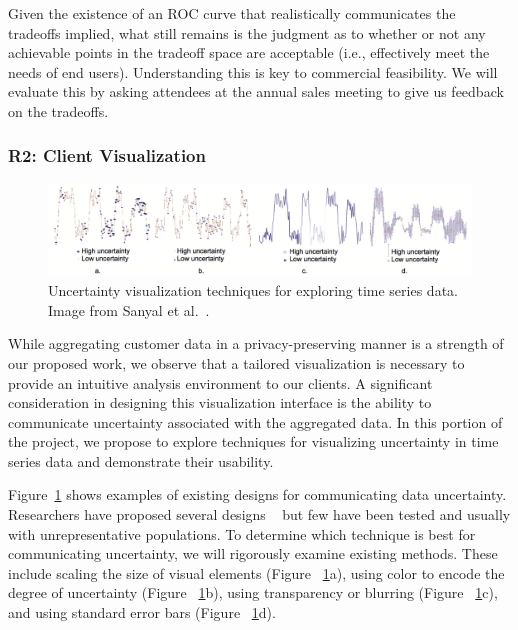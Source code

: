 Given the existence of an ROC curve that realistically communicates the
tradeoffs implied, what still remains is the judgment as to whether or
not any achievable points in the tradeoff space are acceptable (i.e.,
effectively meet the needs of end users).  Understanding
this is key to commercial
feasibility. We will evaluate this by
asking attendees at the annual sales meeting to give us feedback on 
the tradeoffs.

\subsubsection{R2: Client Visualization}

\begin{figure}[t]
	\centering
	\includegraphics[width=1.0\columnwidth]{uncertainty}
	\caption{Uncertainty visualization techniques for exploring time series data. Image from Sanyal et al.~\cite{sanyal2009user}.}
	\label{fig:uncertainty}
\end{figure}

While aggregating customer data in a privacy-preserving manner is a strength of our proposed work, we observe that a tailored visualization is necessary to provide an intuitive analysis environment to our clients. 
A significant consideration in designing this visualization interface is the ability to communicate uncertainty associated with the aggregated data. 
In this portion of the project, we propose to explore techniques for visualizing uncertainty in time series data and demonstrate their usability.

Figure~\ref{fig:uncertainty} shows examples of existing designs for communicating data uncertainty.
Researchers have proposed several designs ~\cite{brodlie2012review,sanyal2009user,sanyal2010noodles,spiegelhalter2011visualizing} but few have been tested and usually with unrepresentative populations.  
To determine which technique is best for communicating uncertainty, we will rigorously examine existing methods. 
These include scaling the size of visual elements (Figure ~\ref{fig:uncertainty}a), using color to encode the degree of uncertainty (Figure ~\ref{fig:uncertainty}b), using transparency or blurring (Figure ~\ref{fig:uncertainty}c), and using standard error bars (Figure ~\ref{fig:uncertainty}d). 


